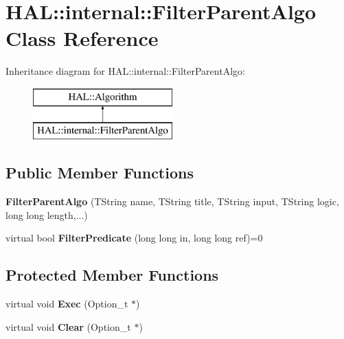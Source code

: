 \hypertarget{class_h_a_l_1_1internal_1_1_filter_parent_algo}{\section{H\-A\-L\-:\-:internal\-:\-:Filter\-Parent\-Algo Class Reference}
\label{class_h_a_l_1_1internal_1_1_filter_parent_algo}
}
Inheritance diagram for H\-A\-L\-:\-:internal\-:\-:Filter\-Parent\-Algo\-:\begin{figure}[H]
\begin{center}
\leavevmode
\includegraphics[height=2.000000cm]{class_h_a_l_1_1internal_1_1_filter_parent_algo}
\end{center}
\end{figure}
\subsection*{Public Member Functions}
\begin{DoxyCompactItemize}
\item 
\hypertarget{class_h_a_l_1_1internal_1_1_filter_parent_algo_a00f0923cc280e9b3594920740872e3ab}{{\bfseries Filter\-Parent\-Algo} (T\-String name, T\-String title, T\-String input, T\-String logic, long long length,...)}\label{class_h_a_l_1_1internal_1_1_filter_parent_algo_a00f0923cc280e9b3594920740872e3ab}

\item 
\hypertarget{class_h_a_l_1_1internal_1_1_filter_parent_algo_a790fa57fca25b128e2818f692cdbf9b6}{virtual bool {\bfseries Filter\-Predicate} (long long in, long long ref)=0}\label{class_h_a_l_1_1internal_1_1_filter_parent_algo_a790fa57fca25b128e2818f692cdbf9b6}

\end{DoxyCompactItemize}
\subsection*{Protected Member Functions}
\begin{DoxyCompactItemize}
\item 
\hypertarget{class_h_a_l_1_1internal_1_1_filter_parent_algo_ad4fc00fdccc72d4d8d80a5c723710861}{virtual void {\bfseries Exec} (Option\-\_\-t $\ast$)}\label{class_h_a_l_1_1internal_1_1_filter_parent_algo_ad4fc00fdccc72d4d8d80a5c723710861}

\item 
\hypertarget{class_h_a_l_1_1internal_1_1_filter_parent_algo_a9a911a5957b05e525c2acf775f7427d3}{virtual void {\bfseries Clear} (Option\-\_\-t $\ast$)}\label{class_h_a_l_1_1internal_1_1_filter_parent_algo_a9a911a5957b05e525c2acf775f7427d3}

\end{DoxyCompactItemize}
